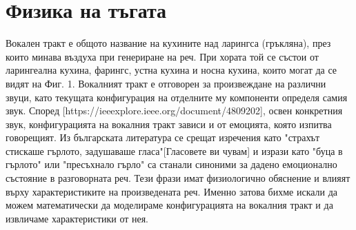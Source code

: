\documentclass[12pt]{report}
\numberwithin{equation}{section}
\numberwithin{figure}{section}
\begin{document}
    \section{Физика на тъгата}
    Вокален тракт е общото название на кухините над ларингса (гръкляна), през които минава въздуха при генериране на реч.
    При хората той се състои от ларингеална кухина, фарингс, устна кухина и носна кухина, които могат да се видят на Фиг. 1.
    Вокалният тракт е отговорен за произвеждане на различни звуци, като текущата конфигурация на отделните му компоненти определя самия звук.
    Според [https://ieeexplore.ieee.org/document/4809202], освен конкретния звук, конфигурацията на вокалния тракт зависи и от емоцията, която изпитва говорещият. 
    Из българската литература се срещат изречения като "страхът стискаше гърлото, задушаваше гласа"[Гласовете ви чувам] и изрази като "буца в гърлото" или "пресъхнало гърло" са станали синоними за дадено емоционално
    състояние в разговорната реч. Тези фрази имат физиологично обяснение и влияят върху характеристиките на произведената реч.
    Именно затова бихме искали да можем математически да моделираме конфигурацията на вокалния тракт и да извличаме характеристики от нея.
\end{document}
